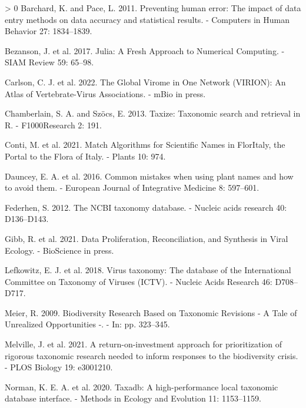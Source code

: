 \documentclass[11pt]{article}
\newlength{\cslhangindent}
\newenvironment{CSLReferences}[3] %
 {%
  \setlength{\parindent}{0pt}
  \ifodd #1 \everypar{\setlength{\hangindent}{\cslhangindent}}\ignorespaces\fi
  \ifnum #2 > 0
  \setlength{\parskip}{#2\baselineskip}
  \fi
 }%
 {}
\begin{document}
\hypertarget{refs}{}
\begin{CSLReferences}{1}{0}
\leavevmode\hypertarget{ref-Barchard2011PreHum}{}%
Barchard, K. and Pace, L. 2011. Preventing human error: The impact of
data entry methods on data accuracy and statistical results. - Computers
in Human Behavior 27: 1834--1839.

\leavevmode\hypertarget{ref-Bezanson2017JulFre}{}%
Bezanson, J. et al. 2017. Julia: A Fresh Approach to Numerical
Computing. - SIAM Review 59: 65--98.

\leavevmode\hypertarget{ref-Carlson2022GloVir}{}%
Carlson, C. J. et al. 2022. The Global Virome in One Network (VIRION):
An Atlas of Vertebrate-Virus Associations. - mBio in press.

\leavevmode\hypertarget{ref-Chamberlain2013TaxTax}{}%
Chamberlain, S. A. and Szöcs, E. 2013. Taxize: Taxonomic search and
retrieval in R. - F1000Research 2: 191.

\leavevmode\hypertarget{ref-Conti2021MatAlg}{}%
Conti, M. et al. 2021. Match Algorithms for Scientific Names in
FlorItaly, the Portal to the Flora of Italy. - Plants 10: 974.

\leavevmode\hypertarget{ref-Dauncey2016ComMis}{}%
Dauncey, E. A. et al. 2016. Common mistakes when using plant names and
how to avoid them. - European Journal of Integrative Medicine 8:
597--601.

\leavevmode\hypertarget{ref-Federhen2012NcbTax}{}%
Federhen, S. 2012. The NCBI taxonomy database. - Nucleic acids research
40: D136--D143.

\leavevmode\hypertarget{ref-Gibb2021DatPro}{}%
Gibb, R. et al. 2021. Data Proliferation, Reconciliation, and Synthesis
in Viral Ecology. - BioScience in press.

\leavevmode\hypertarget{ref-Lefkowitz2018VirTax}{}%
Lefkowitz, E. J. et al. 2018. Virus taxonomy: The database of the
International Committee on Taxonomy of Viruses (ICTV). - Nucleic Acids
Research 46: D708--D717.

\leavevmode\hypertarget{ref-Meier2009BioRes}{}%
Meier, R. 2009. Biodiversity Research Based on Taxonomic Revisions - A
Tale of Unrealized Opportunities -. - In: pp. 323--345.

\leavevmode\hypertarget{ref-Melville2021RetApp}{}%
Melville, J. et al. 2021. A return-on-investment approach for
prioritization of rigorous taxonomic research needed to inform responses
to the biodiversity crisis. - PLOS Biology 19: e3001210.

\leavevmode\hypertarget{ref-Norman2020TaxHig}{}%
Norman, K. E. A. et al. 2020. Taxadb: A high-performance local taxonomic
database interface. - Methods in Ecology and Evolution 11: 1153--1159.


\end{CSLReferences}
\end{document}
